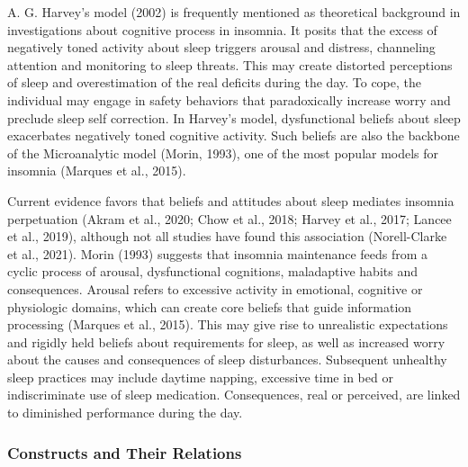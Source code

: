 \documentclass[
  ,doc,11pt, twoside,floatsintext]{apa6}
\begin{document}
A. G. Harvey's model (2002) is frequently mentioned as theoretical background in investigations about cognitive process in insomnia. It posits that the excess of negatively toned activity about sleep triggers arousal and distress, channeling attention and monitoring to sleep threats. This may create distorted perceptions of sleep and overestimation of the real deficits during the day. To cope, the individual may engage in safety behaviors that paradoxically increase worry and preclude sleep self correction. In Harvey's model, dysfunctional beliefs about sleep exacerbates negatively toned cognitive activity. Such beliefs are also the backbone of the Microanalytic model (Morin, 1993), one of the most popular models for insomnia (Marques et al., 2015).

Current evidence favors that beliefs and attitudes about sleep mediates insomnia perpetuation (Akram et al., 2020; Chow et al., 2018; Harvey et al., 2017; Lancee et al., 2019), although not all studies have found this association (Norell-Clarke et al., 2021). Morin (1993) suggests that insomnia maintenance feeds from a cyclic process of arousal, dysfunctional cognitions, maladaptive habits and consequences. Arousal refers to excessive activity in emotional, cognitive or physiologic domains, which can create core beliefs that guide information processing (Marques et al., 2015). This may give rise to unrealistic expectations and rigidly held beliefs about requirements for sleep, as well as increased worry about the causes and consequences of sleep disturbances. Subsequent unhealthy sleep practices may include daytime napping, excessive time in bed or indiscriminate use of sleep medication. Consequences, real or perceived, are linked to diminished performance during the day.

\hypertarget{constructs-and-their-relations}{%
\subsubsection{Constructs and Their Relations}\label{constructs-and-their-relations}}
\end{document}
